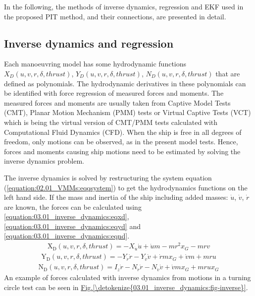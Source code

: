 \documentclass[review]{elsarticle}
\begin{document}
\sphinxAtStartPar
In the following, the methods of inverse dynamics, regression and EKF used in the proposed PIT method, and their connections, are presented in detail.


\subsection{Inverse dynamics and regression}
\label{\detokenize{03.01_inverse_dynamics:inverse-dynamics-and-regression}}\label{\detokenize{03.01_inverse_dynamics::doc}}
\sphinxAtStartPar
Each manoeuvring model has some hydrodynamic functions \(X_D(u,v,r,\delta,thrust)\), \(Y_D(u,v,r,\delta,thrust)\), \(N_D(u,v,r,\delta,thrust)\) that are defined as polynomials. The hydrodynamic derivatives in these polynomials can be identified with force regression of measured forces and moments. The measured forces and moments are usually taken from Captive Model Tests (CMT), Planar Motion Mechanism (PMM) tests or Virtual Captive Tests (VCT) which is being the virtual version of CMT/PMM tests calculated with Computational Fluid Dynamics (CFD). When the ship is free in all degrees of freedom, only motions can be observed, as in the present model tests. Hence, forces and moments causing ship motions need to be estimated by solving the inverse dynamics problem.

\sphinxAtStartPar
The inverse dynamics is solved by restructuring the system equation (\autoref{equation:02.01_VMMs:eqqsystem}) to get the hydrodynamics functions on the left hand side. If the mass and inertia of the ship including added masses: \(\dot{u}\), \(\dot{v}\), \(\dot{r}\) are known, the forces can be calculated using \autoref{equation:03.01_inverse_dynamics:eqxd}, \autoref{equation:03.01_inverse_dynamics:eqyd} and \autoref{equation:03.01_inverse_dynamics:eqnd}.
\begin{equation}\label{equation:03.01_inverse_dynamics:eqxd}
\begin{split}\displaystyle \operatorname{X_{D}}{\left(u,v,r,\delta,thrust \right)} = - X_{\dot{u}} \dot{u} + \dot{u} m - m r^{2} x_{G} - m r v\end{split}
\end{equation}\begin{equation}\label{equation:03.01_inverse_dynamics:eqyd}
\begin{split}\displaystyle \operatorname{Y_{D}}{\left(u,v,r,\delta,thrust \right)} = - Y_{\dot{r}} \dot{r} - Y_{\dot{v}} \dot{v} + \dot{r} m x_{G} + \dot{v} m + m r u\end{split}
\end{equation}\begin{equation}\label{equation:03.01_inverse_dynamics:eqnd}
\begin{split}\displaystyle \operatorname{N_{D}}{\left(u,v,r,\delta,thrust \right)} = I_{z} \dot{r} - N_{\dot{r}} \dot{r} - N_{\dot{v}} \dot{v} + \dot{v} m x_{G} + m r u x_{G}\end{split}
\end{equation}
\sphinxAtStartPar
An example of forces calculated with inverse dynamics from motions in a turning circle test can be seen in \hyperref[\detokenize{03.01_inverse_dynamics:fig-inverse}]{Fig.\@ \ref{\detokenize{03.01_inverse_dynamics:fig-inverse}}}.
\end{document}
